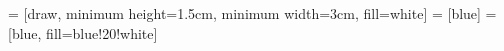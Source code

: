 \newcommand{\schemareduction}[4]{
	\begin{center}
		\reductiondiagram{#1}{#2}{#3}{#4}
	\end{center}
}



\newcommand{\grosotimes}{{\huge\textcolor{blue}{$\otimes$}}}
\newcommand{\grosegal}{\textcolor{blue}{\huge=}}

\newcommand{\fadingsouth}[1]{\begin{tikzpicture}
	\node[scope fading=south] {#1};
	\end{tikzpicture}}


 = [draw, minimum height=1.5cm, minimum width=3cm, fill=white]
 = [blue]
 = [blue, fill=blue!20!white]